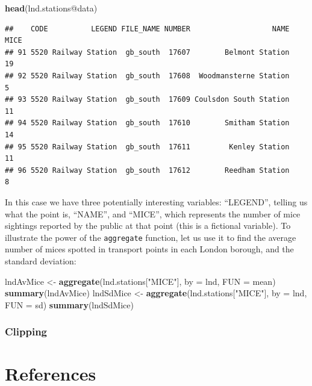\documentclass[]{article}
\newenvironment{Shaded}{}{}
\newcommand{\KeywordTok}[1]{\textcolor[rgb]{0.00,0.44,0.13}{\textbf{{#1}}}}
\newcommand{\DataTypeTok}[1]{\textcolor[rgb]{0.56,0.13,0.00}{{#1}}}
\newcommand{\StringTok}[1]{\textcolor[rgb]{0.25,0.44,0.63}{{#1}}}
\newcommand{\NormalTok}[1]{{#1}}
\begin{document}
\begin{Shaded}
\begin{Highlighting}[]
\KeywordTok{head}\NormalTok{(lnd.stations@data)}
\end{Highlighting}
\end{Shaded}

\begin{verbatim}
##    CODE          LEGEND FILE_NAME NUMBER                   NAME MICE
## 91 5520 Railway Station  gb_south  17607        Belmont Station   19
## 92 5520 Railway Station  gb_south  17608  Woodmansterne Station    5
## 93 5520 Railway Station  gb_south  17609 Coulsdon South Station   11
## 94 5520 Railway Station  gb_south  17610        Smitham Station   14
## 95 5520 Railway Station  gb_south  17611         Kenley Station   11
## 96 5520 Railway Station  gb_south  17612        Reedham Station    8
\end{verbatim}

In this case we have three potentially interesting variables:
``LEGEND'', telling us what the point is, ``NAME'', and ``MICE'', which
represents the number of mice sightings reported by the public at that
point (this is a fictional variable). To illustrate the power of the
\texttt{aggregate} function, let us use it to find the average number of
mices spotted in transport points in each London borough, and the
standard deviation:

\begin{Shaded}
\begin{Highlighting}[]
\NormalTok{lndAvMice <-}\StringTok{ }\KeywordTok{aggregate}\NormalTok{(lnd.stations[}\StringTok{"MICE"}\NormalTok{], }\DataTypeTok{by =} \NormalTok{lnd, }\DataTypeTok{FUN =} \NormalTok{mean)}
\KeywordTok{summary}\NormalTok{(lndAvMice)}
\NormalTok{lndSdMice <-}\StringTok{ }\KeywordTok{aggregate}\NormalTok{(lnd.stations[}\StringTok{"MICE"}\NormalTok{], }\DataTypeTok{by =} \NormalTok{lnd, }\DataTypeTok{FUN =} \NormalTok{sd)}
\KeywordTok{summary}\NormalTok{(lndSdMice)}
\end{Highlighting}
\end{Shaded}

\subsubsection{Clipping}

\section{References}
\end{document}
